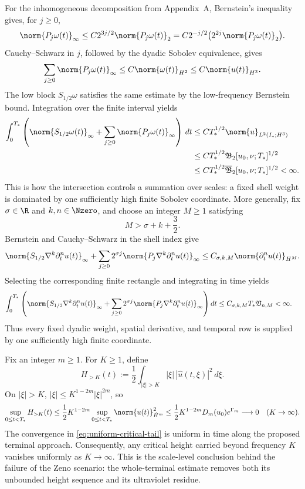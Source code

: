 For the inhomogeneous decomposition from Appendix~A, Bernstein's inequality
gives, for \(j\ge0\),
\[
 \norm{P_j\omega(t)}_\infty
 \le C2^{3j/2}\norm{P_j\omega(t)}_2
 =C2^{-j/2}\bigl(2^{2j}\norm{P_j\omega(t)}_2\bigr).
\]
Cauchy--Schwarz in \(j\), followed by the dyadic Sobolev equivalence, gives
\[
 \sum_{j\ge0}\norm{P_j\omega(t)}_\infty
 \le C\norm{\omega(t)}_{H^2}
 \le C\norm{u(t)}_{H^3}.
\]
The low block \(S_{1/2}\omega\) satisfies the same estimate by the
low-frequency Bernstein bound.  Integration over the finite interval yields
\begin{align*}
 \int_0^{T_*}
 \left(
  \norm{S_{1/2}\omega(t)}_\infty
  +\sum_{j\ge0}\norm{P_j\omega(t)}_\infty
 \right)\,dt
 &\le CT_*^{1/2}\norm{u}_{L^2(I_*;H^3)} \\
 &\le CT_*^{1/2}\mathfrak B_2[u_0,\nu;T_*]^{1/2} \\
 &\le CT_*^{1/2}\overline{\mathfrak B}_2[u_0,\nu;T_*]^{1/2}<\infty.
\end{align*}
This is how the intersection controls a summation over scales: a fixed shell
weight is dominated by one sufficiently high finite Sobolev coordinate.
More generally, fix \(\sigma\in\R\) and \(k,n\in\Nzero\), and choose an
integer \(M\ge1\) satisfying
\[
 M>\sigma+k+\frac32.
\]
Bernstein and Cauchy--Schwarz in the shell index give
\[
 \norm{S_{1/2}\nabla^k\partial_t^n u(t)}_\infty
 +\sum_{j\ge0}2^{\sigma j}
  \norm{P_j\nabla^k\partial_t^n u(t)}_\infty
 \le C_{\sigma,k,M}\norm{\partial_t^n u(t)}_{H^M}.
\]
Selecting the corresponding finite rectangle and integrating in time yields
\begin{align*}
 \int_0^{T_*}
 \left(
  \norm{S_{1/2}\nabla^k\partial_t^n u(t)}_\infty
  +\sum_{j\ge0}2^{\sigma j}
   \norm{P_j\nabla^k\partial_t^n u(t)}_\infty
 \right)dt
 &\le C_{\sigma,k,M}T_*
 \mathfrak V_{n,M}<\infty.
\end{align*}
Thus every fixed dyadic weight, spatial derivative, and temporal row is
supplied by one sufficiently high finite coordinate.

Fix an integer \(m\ge1\).  For \(K\ge1\), define
\[
 H_{>K}(t)
 :=\frac12\int_{|\xi|>K}|\xi|\,|\widehat u(t,\xi)|^2\,d\xi.
\]
On \(|\xi|>K\),
\(|\xi|\le K^{1-2m}|\xi|^{2m}\), so
\begin{equation}
 \sup_{0\le t<T_*}H_{>K}(t)
 \le\frac12K^{1-2m}
 \sup_{0\le t<T_*}\norm{u(t)}_{\dot H^m}^2
 \le\frac12K^{1-2m}D_m(u_0)e^{\Gamma_m}
 \longrightarrow0
 \quad(K\to\infty).
 \label{eq:uniform-critical-tail}
\end{equation}
The convergence in \eqref{eq:uniform-critical-tail} is uniform in time along
the proposed terminal approach.
Consequently, any critical height carried beyond frequency \(K\) vanishes
uniformly as \(K\to\infty\).  This is the scale-level conclusion behind the
failure of the Zeno scenario: the whole-terminal estimate removes both its
unbounded height sequence and its ultraviolet residue.

